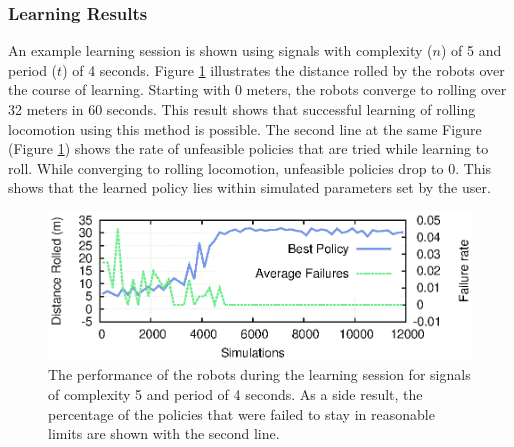 \subsubsection{Learning Results}
An example learning session is shown using signals with complexity ($n$) of 5 and period ($t$) of 4 seconds.  
Figure \ref{fig:learning} illustrates the distance rolled by the robots over the course of learning. 
Starting with 0 meters, the robots converge to rolling over 32 meters in 60 seconds. 
This result shows that successful learning of rolling locomotion using this method is possible. 
The second line at the same Figure (Figure \ref{fig:learning}) shows the rate of unfeasible policies that are tried while learning to roll. 
While converging to rolling locomotion, unfeasible policies drop to 0. 
This shows that the learned policy lies within simulated parameters set by the user.

\begin{figure}[t]
\centering
\includegraphics[width=\columnwidth]{tex/ASME-journal/results/failures/learningVsFailures.eps}
\caption{The performance of the robots during the learning session for signals of complexity 5 and period of 4 seconds. As a side result, the percentage of the policies that were failed to stay in reasonable limits are shown with the second line. }
\label{fig:learning}
\end{figure}


